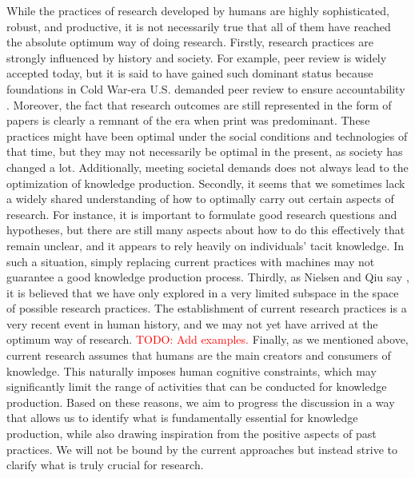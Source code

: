 While the practices of research developed by humans are highly sophisticated, robust, and productive, it is not necessarily true that all of them have reached the absolute optimum way of doing research. Firstly, research practices are strongly influenced by history and society. For example, peer review is widely accepted today, but it is said to have gained such dominant status because foundations in Cold War-era U.S. demanded peer review to ensure accountability \cite{baldwin2018scientific}. Moreover, the fact that research outcomes are still represented in the form of papers is clearly a remnant of the era when print was predominant. These practices might have been optimal under the social conditions and technologies of that time, but they may not necessarily be optimal in the present, as society has changed a lot. Additionally, meeting societal demands does not always lead to the optimization of knowledge production. Secondly, it seems that we sometimes lack a widely shared understanding of how to optimally carry out certain aspects of research. For instance, it is important to formulate good research questions and hypotheses, but there are still many aspects about how to do this effectively that remain unclear, and it appears to rely heavily on individuals' tacit knowledge. In such a situation, simply replacing current practices with machines may not guarantee a good knowledge production process. Thirdly, as Nielsen and Qiu say \cite{nielsen}, it is believed that we have only explored in a very limited subspace in the space of possible research practices. The establishment of current research practices is a very recent event in human history, and we may not yet have arrived at the optimum way of research. \textcolor{red}{TODO: Add examples.} Finally, as we mentioned above, current research assumes that humans are the main creators and consumers of knowledge. This naturally imposes human cognitive constraints, which may significantly limit the range of activities that can be conducted for knowledge production. Based on these reasons, we aim to progress the discussion in a way that allows us to identify what is fundamentally essential for knowledge production, while also drawing inspiration from the positive aspects of past practices. We will not be bound by the current approaches but instead strive to clarify what is truly crucial for research.

